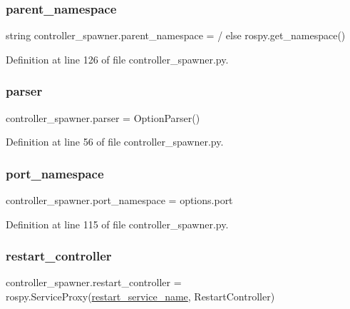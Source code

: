 \subsubsection{\texorpdfstring{parent\+\_\+namespace}{parent\_namespace}}
{\footnotesize\ttfamily string controller\+\_\+spawner.\+parent\+\_\+namespace = \textquotesingle{}/\textquotesingle{} else rospy.\+get\+\_\+namespace()}



Definition at line 126 of file controller\+\_\+spawner.\+py.

\mbox{\label{namespacecontroller__spawner_af87596ad12e5f930a35ae92988be1851}} 
\subsubsection{\texorpdfstring{parser}{parser}}
{\footnotesize\ttfamily controller\+\_\+spawner.\+parser = Option\+Parser()}



Definition at line 56 of file controller\+\_\+spawner.\+py.

\mbox{\label{namespacecontroller__spawner_a831390a07e2261094656c09e0d262c14}} 
\subsubsection{\texorpdfstring{port\+\_\+namespace}{port\_namespace}}
{\footnotesize\ttfamily controller\+\_\+spawner.\+port\+\_\+namespace = options.\+port}



Definition at line 115 of file controller\+\_\+spawner.\+py.

\mbox{\label{namespacecontroller__spawner_ad1bd5e722a8cd83baf3a907520853c2d}} 
\subsubsection{\texorpdfstring{restart\+\_\+controller}{restart\_controller}}
{\footnotesize\ttfamily controller\+\_\+spawner.\+restart\+\_\+controller = rospy.\+Service\+Proxy(\hyperlink{namespacecontroller__spawner_ae74db8f9d8ea66394dacfe6b0838e0b9}{restart\+\_\+service\+\_\+name}, Restart\+Controller)}



